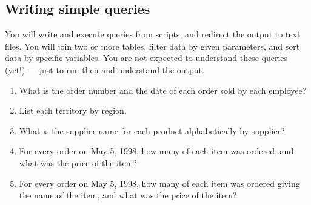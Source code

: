 \documentclass{article}
\begin{document}
        \subsection{Writing simple queries}
        You will write and execute queries from scripts, and redirect the output to text files. You will join two or more tables, filter data by given parameters, and sort data by specific variables. You are not expected to understand these queries (yet!) --- just to run then and understand the output.
        \begin{enumerate}
            \item What is the order number and the date of each order sold by each employee?
            \item List each territory by region.
            \item What is the supplier name for each product alphabetically by supplier?
            \item For every order on May 5, 1998, how many of each item was ordered, and what was the price of the item?
            \item For every order on May 5, 1998, how many of each item was ordered giving the name of the item, and what was the price of the item?

\end{enumerate}
\end{document}
